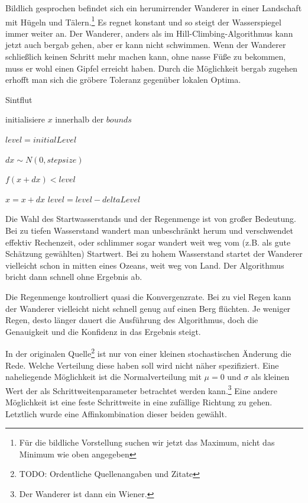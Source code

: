 \documentclass[a4paper,12pt]{article}
\begin{document}
Bildlich gesprochen befindet sich ein herumirrender Wanderer in einer Landschaft mit Hügeln und Tälern.\footnote{Für die bildliche Vorstellung suchen wir jetzt das Maximum, nicht das Minimum wie oben angegeben} Es regnet konstant und so steigt der Wasserspiegel immer weiter an. Der Wanderer, anders als im Hill-Climbing-Algorithmus kann jetzt auch bergab gehen, aber er kann nicht schwimmen. Wenn der Wanderer schließlich keinen Schritt mehr machen kann, ohne nasse Füße zu bekommen, muss er wohl einen Gipfel erreicht haben. Durch die Möglichkeit bergab zugehen erhofft man sich die gröbere Toleranz gegenüber lokalen Optima.

\begin{algorithm}
\caption{Sintflut}
\begin{algorithmic}

\State initialisiere $x$ innerhalb der $bounds$

\State $level = initialLevel$


	$dx \sim N(0, stepsize)$

	\If $f(x + dx) < level$
	
		\State $x = x + dx$
		\State $level = level - deltaLevel$
	\EndIf

\EndFor

\EndFunction	
\end{algorithmic}
\end{algorithm}

Die Wahl des Startwasserstands und der Regenmenge ist von großer Bedeutung. Bei zu tiefen Wasserstand wandert man unbeschränkt herum und verschwendet effektiv Rechenzeit, oder schlimmer sogar wandert weit weg vom (z.B. als gute Schätzung gewählten) Startwert. Bei zu hohem Wasserstand startet der Wanderer vielleicht schon in mitten eines Ozeans, weit weg von Land. Der Algorithmus bricht dann schnell ohne Ergebnis ab.

Die Regenmenge kontrolliert quasi die Konvergenzrate. Bei zu viel Regen kann der Wanderer vielleicht nicht schnell genug auf einen Berg flüchten. Je weniger Regen, desto länger dauert die Ausführung des Algorithmus, doch die Genauigkeit und die Konfidenz in das Ergebnis steigt.

In der originalen Quelle\footnote{TODO: Ordentliche Quellenangaben und Zitate} ist nur von einer kleinen stochastischen Änderung die Rede. Welche Verteilung diese haben soll wird nicht näher spezifiziert. Eine naheliegende Möglichkeit ist die Normalverteilung mit $\mu = 0$ und $\sigma$ als kleinen Wert der als Schrittweitenparameter betrachtet werden kann.\footnote{Der Wanderer ist dann ein Wiener.} Eine andere Möglichkeit ist eine feste Schrittweite in eine zufällige Richtung zu gehen. Letztlich wurde eine Affinkombination dieser beiden gewählt. 
\end{document}
